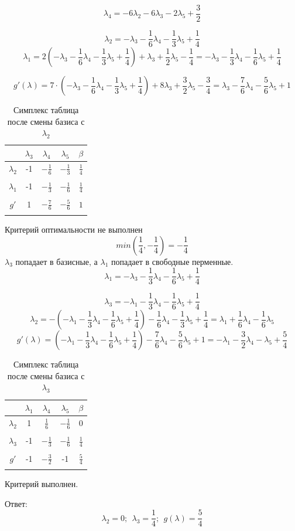 \documentclass{article}
\begin{document}
\[\lambda_4 = -6\lambda_2-6\lambda_3-2\lambda_5 +\frac{3}{2}\]

\[\lambda_2 = -\lambda_3 - \frac{1}{6}\lambda_4 - \frac{1}{3}\lambda_5 +\frac{1}{4}\]
\[\lambda_1 = 2(-\lambda_3 - \frac{1}{6}\lambda_4 - \frac{1}{3}\lambda_5 +\frac{1}{4})+ \lambda_3 +\frac{1}{2}\lambda_5 -\frac{1}{4} =
-\lambda_3 - \frac{1}{3}\lambda_4 - \frac{1}{6}\lambda_5 + \frac{1}{4}\]

\[g'(\lambda) = 7\cdot(-\lambda_3 - \frac{1}{6}\lambda_4 - \frac{1}{3}\lambda_5 +\frac{1}{4}) +8\lambda_3 +\frac{3}{2}\lambda_5 - \frac{3}{4} = \lambda_3 - \frac{7}{6}\lambda_4 - \frac{5}{6}\lambda_5 +1 \]

\begin{table}[H]
    \centering
    \caption{Симплекс таблица после смены базиса с $\lambda_2$}
    \begin{tabular}{|c|c|c|c|c|}
    \hline
    &$\lambda_3$&$\lambda_4$&$\lambda_5$&$\beta$\\\hline
    $\lambda_2$&-1&$-\frac{1}{6}$&$-\frac{1}{3}$&$\frac{1}{4}$\\
    &&&&\\\hline
    $\lambda_1$&-1&$-\frac{1}{3}$&$-\frac{1}{6}$&$\frac{1}{4}$\\
    &&&&\\\hline
    $g'$&1&$-\frac{7}{6}$&$-\frac{5}{6}$&$1$\\
    &&&&\\\hline
    \end{tabular}
\end{table}

Критерий оптимальности не выполнен 
\[min(\frac{1}{4}, -\frac{1}{4}) = -\frac{1}{4}\]
$\lambda_3$ попадает в базисные, а $\lambda_1$ попадает в свободные перменные.
\[\lambda_1 = -\lambda_3 - \frac{1}{3}\lambda_4 - \frac{1}{6}\lambda_5 + \frac{1}{4}\]

\[\lambda_3 = -\lambda_1-\frac{1}{3}\lambda_4-\frac{1}{6}\lambda_5+\frac{1}{4}\]
\[\lambda_2 = -(-\lambda_1-\frac{1}{3}\lambda_4-\frac{1}{6}\lambda_5+\frac{1}{4}) - \frac{1}{6}\lambda_4 - \frac{1}{3}\lambda_5 +\frac{1}{4} =
\lambda_1 + \frac{1}{6}\lambda_4-\frac{1}{6}\lambda_5\]
\[g'(\lambda) = (-\lambda_1-\frac{1}{3}\lambda_4-\frac{1}{6}\lambda_5+\frac{1}{4}) - \frac{7}{6}\lambda_4 - \frac{5}{6}\lambda_5 +1 = 
-\lambda_1 - \frac{3}{2}\lambda_4 - \lambda_5+\frac{5}{4}\]

\begin{table}[H]
    \centering
    \caption{Симплекс таблица после смены базиса с $\lambda_3$}
    \begin{tabular}{|c|c|c|c|c|}
    \hline
    &$\lambda_1$&$\lambda_4$&$\lambda_5$&$\beta$\\\hline
    $\lambda_2$&1&$\frac{1}{6}$&$-\frac{1}{6}$&$0$\\
    &&&&\\\hline
    $\lambda_3$&-1&$-\frac{1}{3}$&$-\frac{1}{6}$&$\frac{1}{4}$\\
    &&&&\\\hline
    $g'$&-1&$-\frac{3}{2}$&-1&$\frac{5}{4}$\\
    &&&&\\\hline
    \end{tabular}
\end{table}
Критерий выполнен.

Ответ:
\[\lambda_2 = 0;\ \ \lambda_3 = \frac{1}{4}; \ \ g(\lambda) = \frac{5}{4}\]
\end{document}
